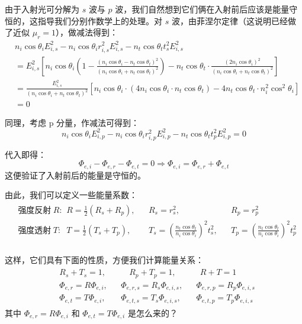 \documentclass[UTF8]{report}
\theoremstyle{MyLineTheoremStyle} %
\theoremstyle{MyBlockTheoremStyle} %
\theoremstyle{MySubsubsectionStyle} %
\begin{document}
由于入射光可分解为 $s$ 波与 $p$ 波，我们自然想到它们俩在入射前后应该是能量守恒的，这指导我们分别作数学上的处理。对 $s$ 波，由菲涅尔定律（这说明已经做了近似 $\mu_r = 1$），做减法得到：
\begin{align*}
&n_i \cos \theta_i E_{i,s}^2 - n_i \cos \theta_i r_{i,s}^2E_{i,s}^2 -   n_t \cos \theta_t t_s^2E_{i,s}^2 \\
&= E_{i,s}^2 \left[ n_i\cos \theta_i \left( 1 - \frac{(n_i\cos \theta_i - n_t \cos \theta_t)^2}{(n_i\cos \theta_i + n_t \cos \theta_t)^2} \right) - n_t \cos \theta_t \cdot \frac{(2n_i \cos \theta_i)^2}{(n_i\cos \theta_i + n_t \cos \theta_t)^2} \right] \\ 
& = \frac{E_{i,s}^2}{(n_i\cos \theta_i + n_t \cos \theta_t)^2} \left[ n_i \cos \theta_i \cdot (4 n_i\cos \theta_i \cdot n_t \cos \theta_t) - 4 n_t \cos \theta_t \cdot n_i^2 \cos^2 \theta_i\right] \\ 
& = 0
\end{align*}

同理，考虑 p 分量，作减法可得到：
\begin{equation}
n_i \cos \theta_i E_{i,p}^2 - n_i \cos \theta_i r_{i,p}^2E_{i,p}^2 -   n_t \cos \theta_t t_p^2E_{i,p}^2 = 0
\end{equation}

代入即得：
\begin{equation}
    \Phi_{e,i} - \Phi_{e,r} - \Phi_{e,t} = 0 \Longrightarrow  \Phi_{e,i} = \Phi_{e,r} + \Phi_{e,t}
\end{equation}
这便验证了入射前后的能量是守恒的。

由此，我们可以定义一些能量系数：
\begin{gather}
\begin{aligned}
    &\text{强度反射率 $R$: }\ &&R = \frac{1}{2}(R_s + R_p), &&R_s = r_s^2, && R_p = r_p^2 \\
    &\text{强度透射率 $T$: }\ &&T = \frac{1}{2}(T_s + T_p), &&T_s = \left( \frac{n_t \cos \theta_t}{n_i \cos \theta_i} \right)^2 t_s^2, && T_p = \left( \frac{n_t \cos \theta_t}{n_i \cos \theta_i} \right)^2 t_p^2 \\
\end{aligned}
\end{gather}

这样，它们具有下面的性质，方便我们计算能量关系：
\begin{gather}
\boxed{
\begin{aligned}
    &R_s + T_s = 1, &&\quad  R_p + T_p = 1,&&\ \  R + T = 1 \\ 
    &\Phi_{e,r} = R\Phi_{e,i}, && 
    \Phi_{e,r,s} = R_s\Phi_{e,i,s}, &&  \Phi_{e,r,p} = R_p\Phi_{e,i,s} 
    \\ 
    &\Phi_{e,t} = T\Phi_{e,i}, && \Phi_{e,t,s} = T_s\Phi_{e,i,s}, && \Phi_{e,t,p} = T_p\Phi_{e,i,s}
\end{aligned}
}
\end{gather}
{\color{red} 其中 $\Phi_{e,r} = R\Phi_{e,i}$ 和 $\Phi_{e,t} = T\Phi_{e,i}$ 是怎么来的？}
\end{document}
